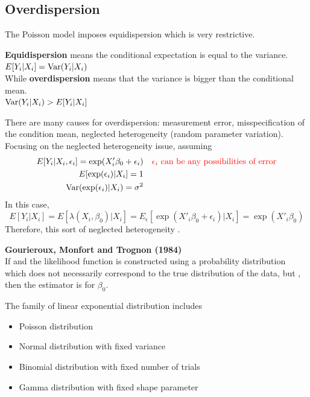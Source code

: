 \subsection{Overdispersion}
The Poisson model imposes equidispersion which is very restrictive.
\begin{definition}
    \textbf{Equidispersion} means the conditional expectation is equal to the variance.\\
    $E[Y_i|X_i] = \operatorname{Var}(Y_i|X_i)$\\
    While \textbf{overdispersion} means that the variance is bigger than the conditional mean.\\
    $\operatorname{Var}(Y_i|X_i)>E[Y_i|X_i]$
\end{definition}
There are many causes for overdispersion: measurement error, misspecification of the condition mean, neglected heterogeneity (random parameter variation).
Focusing on the neglected heterogeneity issue, assuming
\begin{align*}
    E[Y_i|X_i,\epsilon_i] = \exp(X'_i\beta_0+\epsilon_i)&\quad \textcolor{red}{\epsilon_i\text{ can be any possibilities of error}}\\
    E[\exp(\epsilon_i)|X_i] = 1\\
    \operatorname{Var}(\exp(\epsilon_i)|X_i) = \sigma^2
\end{align*}
In this case,
\begin{equation*}
    E[Y_i|X_i] = E[\lambda(X_i,\beta_0)|X_i] = E_{\epsilon}[\exp(X'_i\beta_0+\epsilon_i)|X_i] = \exp(X'_i\beta_0)
\end{equation*}
Therefore, this sort of neglected heterogeneity .
\begin{theorem}
    \textbf{Gourieroux, Monfort and Trognon (1984)}\\
    If  and the likelihood function is constructed
    using a probability distribution which does not necessarily correspond to the true distribution of the data,
    but , 
    then the  estimator is  for $\beta_0$.
\end{theorem}
The family of linear exponential distribution includes
\begin{itemize}
    \item Poisson distribution
    \item Normal distribution with fixed variance 
    \item Binomial distribution with fixed number of trials
    \item Gamma distribution with fixed shape parameter
\end{itemize}


